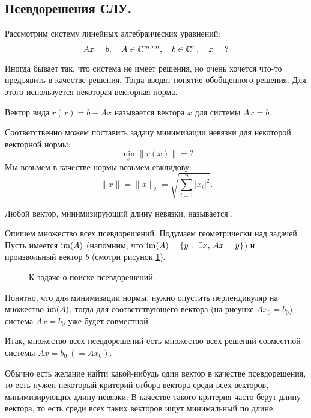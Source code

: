 \newpage
{}

\subsection{Псевдорешения СЛУ.}

Рассмотрим систему линейных алгебраических уравнений:
\[
    Ax=b,\quad A\in\mathbb{C}^{m\times n},\quad b\in\mathbb{C}^{n},\quad x=\text{?}    
\]

Иногда бывает так, что система не имеет решения, но очень хочется что-то предъявить в качестве решения. Тогда вводят понятие обобщенного 
решения. Для этого используется некоторая векторная норма.

\begin{definition}
    Вектор вида $r(x)=b-Ax$ называется  вектора $x$ для системы $Ax=b$.
\end{definition}

Соответственно можем поставить задачу минимизации невязки для некоторой векторной нормы:
\[
    \min_{x}\|r(x)\| = \text{?}
\]
Мы возьмем в качестве нормы возьмем евклидову:
\[
    \|x\|=\|x\|_2=\sqrt{\sum_{i=1}^n |x_i|^2}.
\]
\begin{definition}
    Любой вектор, минимизирующий длину невязки, называется .
\end{definition}

Опишем множество всех псевдорешений. Подумаем геометрически над задачей. Пусть имеется $\operatorname{im}(A)$ (напомним, что $\operatorname{im}(A)=\{y:\ \exists x,\, Ax=y\}$) и произвольный 
вектор $b$ (смотри рисунок \ref{fig:im}).

\begin{figure}[!ht]
    \centering
    
    \caption{К задаче о поиске псевдорешений.}
    \label{fig:im}
\end{figure}

Понятно, что для минимизации нормы, нужно опустить перпендикуляр на множество $\operatorname{im}(A)$, тогда для соответствующего 
вектора (на рисунке $Ax_0=b_0$) система $Ax=b_0$ уже будет совместной.

Итак, множество всех псевдорешений есть множество всех решений совместной системы $Ax=b_0\ (=Ax_0)$.

Обычно есть желание найти какой-нибудь один вектор в качестве псевдорешения, то есть нужен некоторый критерий отбора вектора среди всех векторов,
минимизирующих длину невязки. В качестве такого критерия часто берут длину вектора, то есть среди всех таких векторов ищут минимальный по длине.


